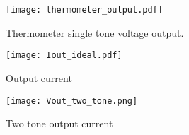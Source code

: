 \begin{appendices}
\begin{figure}[h] 
\texttt{[image: thermometer\_output.pdf]}
\caption{Thermometer single tone voltage output.}
\label{fig:Thermometer}
\end{figure}

\begin{figure}[h] 
\texttt{[image: Iout\_ideal.pdf]}
\caption{Output current}
\label{fig:Output current}
\end{figure}

\begin{figure}[h] 
\texttt{[image: Vout\_two\_tone.png]}
\caption{Two tone output current}
\label{transient_two_tone}
\end{figure}
\end{appendices}
